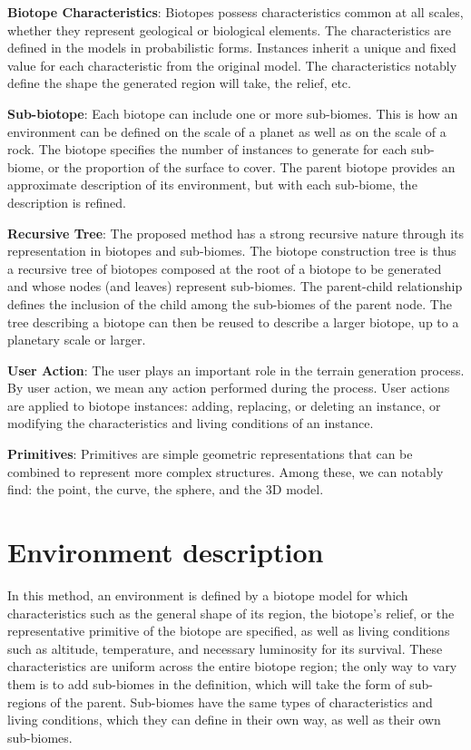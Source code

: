 \textbf{Biotope Characteristics}: Biotopes possess characteristics common at all scales, whether they represent geological or biological elements. The characteristics are defined in the models in probabilistic forms. Instances inherit a unique and fixed value for each characteristic from the original model. The characteristics notably define the shape the generated region will take, the relief, etc.

\textbf{Sub-biotope}: Each biotope can include one or more sub-biomes. This is how an environment can be defined on the scale of a planet as well as on the scale of a rock. The biotope specifies the number of instances to generate for each sub-biome, or the proportion of the surface to cover. The parent biotope provides an approximate description of its environment, but with each sub-biome, the description is refined.

\textbf{Recursive Tree}: The proposed method has a strong recursive nature through its representation in biotopes and sub-biomes. The biotope construction tree is thus a recursive tree of biotopes composed at the root of a biotope to be generated and whose nodes (and leaves) represent sub-biomes. The parent-child relationship defines the inclusion of the child among the sub-biomes of the parent node. The tree describing a biotope can then be reused to describe a larger biotope, up to a planetary scale or larger.

\textbf{User Action}: The user plays an important role in the terrain generation process. By user action, we mean any action performed during the process. User actions are applied to biotope instances: adding, replacing, or deleting an instance, or modifying the characteristics and living conditions of an instance.

\textbf{Primitives}: Primitives are simple geometric representations that can be combined to represent more complex structures. Among these, we can notably find: the point, the curve, the sphere, and the 3D model.

\section{Environment description}
In this method, an environment is defined by a biotope model for which characteristics such as the general shape of its region, the biotope's relief, or the representative primitive of the biotope are specified, as well as living conditions such as altitude, temperature, and necessary luminosity for its survival. These characteristics are uniform across the entire biotope region; the only way to vary them is to add sub-biomes in the definition, which will take the form of sub-regions of the parent. Sub-biomes have the same types of characteristics and living conditions, which they can define in their own way, as well as their own sub-biomes.

